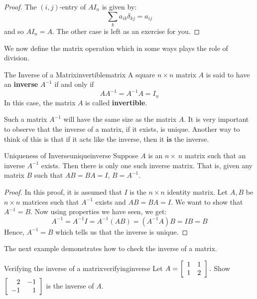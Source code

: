 \begin{proof}
The $(i,j)$-entry of $AI_n$ is given by:
\begin{equation*}
\sum_{k}a_{ik}\delta _{kj}=a_{ij}
\end{equation*}
and so $AI_{n}=A.$ The other case is left as an exercise for you. 
\end{proof}

We now define the matrix operation which in some ways plays the role of division. 

\begin{definition}{The Inverse of a Matrix}{invertiblematrix}
A square  $n\times n$ matrix $A$ is said to have an \textbf{inverse} $A^{-1}$
if and only if 
\begin{equation*}
AA^{-1}=A^{-1}A=I_n
\end{equation*}
In this case, the matrix $A$ is called
 \textbf{invertible}.
\end{definition}

Such a  matrix $A^{-1}$ will have the same size as the matrix $A$. 
It is very important to observe that the inverse of a matrix, if it exists,
is unique. Another way to think of this is that if it acts like the inverse,
then it $\textbf{is}$ the inverse.

\begin{theorem}{Uniqueness of Inverse}{uniqueinverse}
Suppose $A$ is an $n \times\ n$ matrix such that an inverse  $A^{-1}$ exists. Then there is only one such 
inverse matrix. 
That is, given any matrix $B$ such that $AB=BA=I$, $B=A^{-1}$.
\end{theorem}

\begin{proof} In this proof, it is assumed that $I$ is the $n \times n$ identity matrix. 
Let $A, B$ be $n \times n$ matrices such that $A^{-1}$ exists and $AB=BA=I$. 
We want to show that $A^{-1} = B$. 
Now using properties we have seen, we get: 
\begin{equation*}
A^{-1}=A^{-1}I=A^{-1}\left( AB\right) =\left( A^{-1}A\right) B=IB=B
\end{equation*}
Hence, $A^{-1} = B$ which tells us that the inverse is unique.
\end{proof}

The next example demonstrates how to check the inverse of a matrix. 

\begin{example}{Verifying the inverse of a matrix}{verifyinginverse}
Let $A=\left[
\begin{array}{rr}
1 & 1 \\
1 & 2
\end{array}
\right] .$ Show $\left[
\begin{array}{rr}
2 & -1 \\
-1 & 1
\end{array}
\right] $ is the inverse of $A.$
\end{example}

